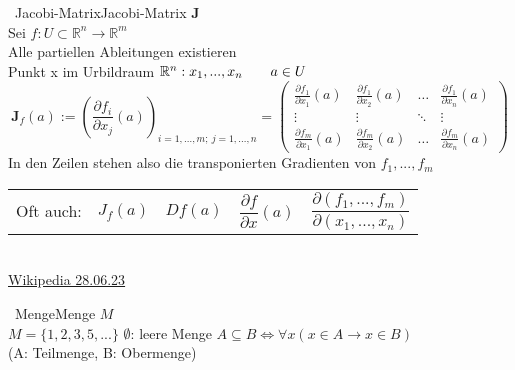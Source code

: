 		
		\begin{proposition}{\currentboxsection \ Jacobi-Matrix}{Jacobi-Matrix} \label{jacobi_matrix}  \hspace{11cm} $\mathbf{J}$ \\
			Sei $f: U\subset \mathbb{R} ^{n}\to \mathbb{R} ^{m}$ \\
			Alle partiellen Ableitungen existieren \\
			Punkt x im Urbildraum $\mathbb{R}^n: x_1, ..., x_n \quad \quad a \in U$
			\begin{equation}
				\mathbf{J}_f(a) := \left(\frac{\partial f_i}{\partial x_j}(a)\right)_{i=1,\ldots ,m;\ j=1,\ldots ,n} =
				\begin{pmatrix}
					\frac{\partial f_1}{\partial x_1}(a) & \frac{\partial f_1}{\partial x_2}(a) & \ldots & \frac{\partial f_1}{\partial x_n}(a) \\
					\vdots & \vdots & \ddots & \vdots \\
					\frac{\partial f_m}{\partial x_1}(a) & \frac{\partial f_m}{\partial x_2}(a) & \ldots & \frac{\partial f_m}{\partial x_n}(a)
				\end{pmatrix}
			\end{equation}
			In den Zeilen stehen also die transponierten Gradienten von $f_1, ..., f_m$ \\
			\begin{tabular}{@{}m{1.7cm}m{1.5cm}m{1.5cm}m{1.5cm}m{4cm}@{}}
				Oft auch: \rule{0pt}{0.8cm} & \large $J_f(a)$ \rule{0pt}{0.9cm}& \large $Df(a)$ \rule{0pt}{0.9cm}& \large $\dfrac{\partial f}{\partial x}(a)$ \rule{0pt}{0.9cm}& \large $\dfrac{\partial (f_1, ..., f_m)}{\partial (x_1, ..., x_n)}$ \rule{0pt}{0.9cm} \\[0.7cm]
			\end{tabular} \\
			\href{https://de.wikipedia.org/wiki/Jacobi-Matrix}{Wikipedia 28.06.23}
		\end{proposition}
		
	 \label{sec:mengenlehre}
		\begin{proposition}{\currentboxsection \ Menge}{Menge} \hspace{12.1cm} $M$ \label{menge}  \\
			$M = \{1,2,3,5,...\} $ \hspace{2.5cm} $\emptyset$: leere Menge { } \hspace{0.5cm} $A \subseteq B \iff \forall x (x \in A \rightarrow x \in B ) $\\
			(A: Teilmenge, B: Obermenge)
		\end{proposition}
		
